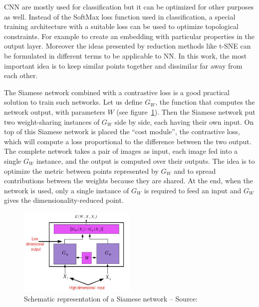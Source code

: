 \documentclass[a4paper,12pt]{report}
\begin{document}
CNN are mostly used for classification but it can be optimized for other purposes as well.
Instead of the SoftMax loss function used in classification, a special training architecture with a suitable loss can be used to optimize topological constraints.
For example to create an embedding with particular properties in the output layer.
Moreover the ideas presented by reduction methods like t-SNE can be formulated in different terms to be applicable to NN.
In this work, the most important idea is to keep similar points together and dissimilar far away from each other.

The Siamese network combined with a contrastive loss is a good practical solution to train such networks\cite{bromley1993signature}\cite{chopra2005learning}.
Let us define $G_W$, the function that computes the network output, with parameters $W$ (see figure~\ref{fig:siamese_network}).
Then the Siamese network put two weight-sharing instances of $G_W$ side by side, each having their own input.
On top of this Siamese network is placed the ``cost module'', the contrastive loss, which will compute a loss proportional to the difference between the two output.
The complete network takes a pair of images as input, each image fed into a single $G_W$ instance, and the output is computed over their outputs.
The idea is to optimize the metric between points represented by $G_W$ and to spread contributions between the weights because they are shared.
At the end, when the network is used, only a single instance of $G_W$ is required to feed an input and $G_W$ gives the dimensionality-reduced point.

\begin{figure}[t]
    \begin{center}
        \includegraphics[width=0.5\textwidth]{thesis_figures/siamese_network.jpg}
    \end{center}
    \caption{Schematic representation of a Siamese network -- Source:~\cite{bromley1993signature}}
    \label{fig:siamese_network}
\end{figure}
\end{document}
